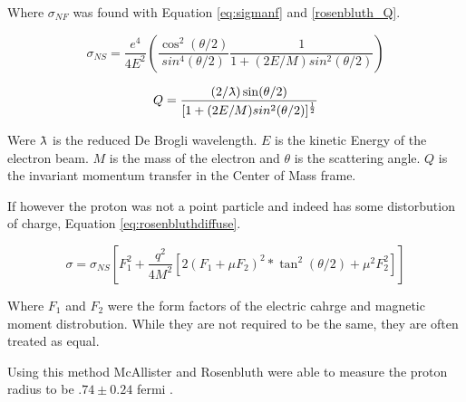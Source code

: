 \documentclass[12pt]{article}
\begin{document}
Where $\sigma_{NF}$ was found with Equation \ref{eq:sigmanf} and \ref{rosenbluth_Q}.

\begin{equation}\label{eq:sigmanf}
    \sigma_{NS} = \frac{e^4}{4E^2}(\frac{\cos^2(\theta/2)}{sin^4(\theta/2)}\frac{1}{1+(2E/M)sin^2(\theta/2)})
\end{equation}

\newcommand{\lambdabar}{{\mkern0.75mu\mathchar '26\mkern -9.75mu\lambda}}

\begin{equation}\label{rosenbluth_Q}
    Q = \frac{(2/\lambdabar)\sin(\theta/2)}{[1+(2E/M)sin^2(\theta/2)]^\frac{1}{2}}
\end{equation}

Were $\lambdabar$ is the reduced De Brogli wavelength. $E$ is the kinetic Energy of the electron beam. $M$ is the mass of the electron and $\theta$  is the scattering angle. $Q$ is the invariant momentum transfer in the Center of Mass frame.

If however the proton was not a point particle and indeed has some distorbution of charge, Equation \ref{eq:rosenbluthdiffuse}.

\begin{equation}\label{eq:rosenbluthdiffuse}
    \sigma = \sigma_{NS}[F_1^2 + \frac{q^2}{4M^2}[2(F_1+\mu{F_2})^2*\tan^2(\theta/2)+\mu^2F_2^2]]
\end{equation}

Where $F_1$ and $F_2$ were the form factors of the electric cahrge and magnetic moment distrobution. While they are not required to be the same, they are often treated as equal.

Using this method McAllister and Rosenbluth were able to measure the proton radius to be $.74 \pm 0.24$ fermi .



\end{document}
